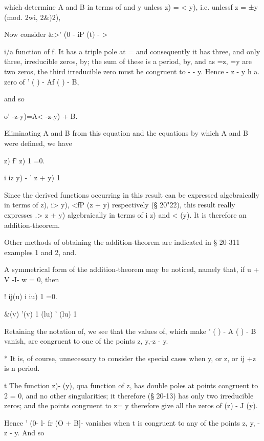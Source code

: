 {which determine A and B in terms of and y unless z) = < y), i.e.
unlessf z = ±y (mod. 2wi, 2\&)2),

Now consider \&>' (0 - iP (t) - >

 i/a function of f. It has a triple pole at = and consequently it has
three, and only three, irreducible zeros, by; the sum of these
is a period, by, and as =z, =y are two zeros, the third
irreducible zero must be congruent to - - y. Hence - z - y h a. zero
of ' ( ) - Af ( ) - B,

and so

 o' -z-y)=A< -z-y) + B.

Eliminating A and B from this equation and the equations by which A
and B were defined, we have

  z) f' z) 1 =0.

i iz y) - ' z + y) 1

Since the derived functions occurring in this result can be expressed
algebraically in terms of z), i> y), <fP (z + y) respectively (§
20"22), this result really expresses .> z + y) algebraically in terms
of i z) and < (y). It is therefore an addition-theorem.

Other methods of obtaining the addition-theorem are indicated in §
20-311 examples 1 and 2, and.

A symmetrical form of the addition-theorem may be noticed, namely
that, if u + V -I- w = 0, then

! ij(u) i iu) 1 =0.

\&(v) '(v) 1 (lu) ' (lu) 1


Retaining the notation of, we see that the values of, which
make ' ( ) - A ( ) - B vanish, are congruent to one of the points z,
y,-z - y.

* It is, of course, unnecessary to consider the special cases when y,
or z, or ij +z is n period.

t The function z)- (y), qua function of z, has double poles at points
congruent to 2 = 0, and no other singularities; it therefore (§
20-13) has only two irreducible zeros; and the points congruent to z=
y therefore give all the zeros of (z) - J (y).

%
%

Hence ' (0- l- fr (O + B]- vanishes when t is congruent to any of the
points z, y, - z - y. And so

}
